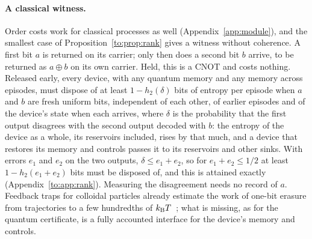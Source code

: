 \paragraph{A classical witness.} Order costs work for classical processes as well (Appendix~\ref{app:module}), and the smallest case of Proposition~\ref{to:prop:rank} gives a witness without coherence. A first bit $a$ is returned on its carrier; only then does a second bit $b$ arrive, to be returned as $a\oplus b$ on its own carrier. Held, this is a CNOT and costs nothing. Released early, every device, with any quantum memory and any memory across episodes, must dispose of at least $1-h_2(\delta)$ bits of entropy per episode when $a$ and $b$ are fresh uniform bits, independent of each other, of earlier episodes and of the device's state when each arrives, where $\delta$ is the probability that the first output disagrees with the second output decoded with $b$: the entropy of the device as a whole, its reservoirs included, rises by that much, and a device that restores its memory and controls passes it to its reservoirs and other sinks. With errors $e_1$ and $e_2$ on the two outputs, $\delta\le e_1+e_2$, so for $e_1+e_2\le1/2$ at least $1-h_2(e_1+e_2)$ bits must be disposed of, and this is attained exactly (Appendix~\ref{to:app:rank}). Measuring the disagreement needs no record of $a$. Feedback traps for colloidal particles already estimate the work of one-bit erasure from trajectories to a few hundredths of $k_{\mathrm B} T$~\cite{Jun14}; what is missing, as for the quantum certificate, is a fully accounted interface for the device's memory and controls.

